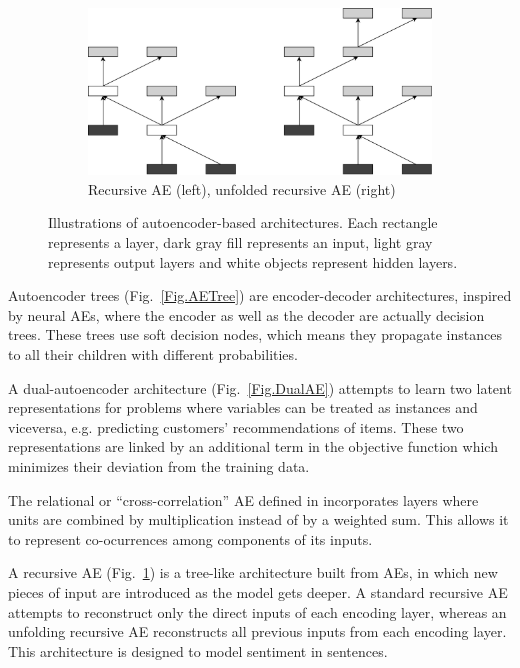 \documentclass[preprint,5p,compress]{elsarticle}
\begin{document}
\begin{figure}[ht!]
  \begin{subfigure}[t]{\columnwidth}
    \centering
    \includegraphics[width=\textwidth]{ArchRecAE.pdf}
    \caption{\label{Fig.RecAE}Recursive AE (left), unfolded recursive AE (right)}
  \end{subfigure}
  \caption{\label{Fig.AEarch}Illustrations of autoencoder-based architectures. Each rectangle represents a layer, dark gray fill represents an input, light gray represents output layers and white objects represent hidden layers.}
  
\end{figure}

Autoencoder trees \cite{irsoy_unsupervised_2017} (Fig.~\ref{Fig.AETree}) are encoder-decoder architectures, inspired by neural AEs, where the encoder as well as the decoder are actually decision trees. These trees use soft decision nodes, which means they propagate instances to all their children with different probabilities. 

A dual-autoencoder architecture \cite{He2017} (Fig.~\ref{Fig.DualAE}) attempts to learn two latent representations for problems where variables can be treated as instances and viceversa, e.g. predicting customers' recommendations of items. These two representations are linked by an additional term in the objective function which minimizes their deviation from the training data.

The relational or ``cross-correlation'' AE defined in \cite{MemisevicRelational} incorporates layers where units are combined by multiplication instead of by a weighted sum. This allows it to represent co-ocurrences among components of its inputs.

A recursive AE \cite{RecursiveAE} (Fig.~\ref{Fig.RecAE}) is a tree-like architecture built from AEs, in which new pieces of input are introduced as the model gets deeper. A standard recursive AE attempts to reconstruct only the direct inputs of each encoding layer, whereas an unfolding recursive AE \cite{UnfoldingRecAE} reconstructs all previous inputs from each encoding layer. This architecture is designed to model sentiment in sentences.
\end{document}

